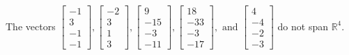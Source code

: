 \begin{exercise}
\begin{exerciseStatement}
  \end{exerciseStatement}
  \begin{exerciseAnswer}
   The vectors \(\left[\begin{array}{r}
-1 \\
3 \\
-1 \\
-1
\end{array}\right] , \left[\begin{array}{r}
-2 \\
3 \\
1 \\
3
\end{array}\right] , \left[\begin{array}{r}
9 \\
-15 \\
-3 \\
-11
\end{array}\right] , \left[\begin{array}{r}
18 \\
-33 \\
-3 \\
-17
\end{array}\right] , \text{ and } \left[\begin{array}{r}
4 \\
-4 \\
-2 \\
-3
\end{array}\right]\) 
  	 do not  
	span \(\mathbb{R}^4\).
  


  \end{exerciseAnswer}
\end{exercise}